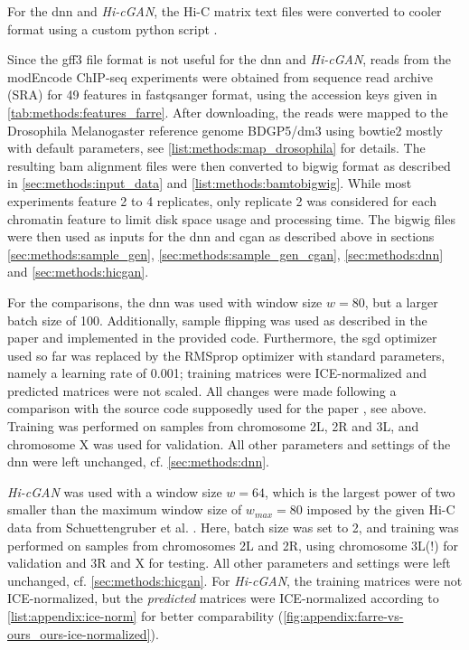 For the \acrshort{dnn} and \emph{Hi-cGAN}, the Hi-C matrix text files were converted to cooler format 
using a custom python script \cite[scripts/schuettengruberToCooler.py]{Krauth2021b}.

Since the gff3 file format is not useful for the \acrshort{dnn} and \emph{Hi-cGAN}, reads from the modEncode ChIP-seq experiments \cite{Roy2010} 
were obtained from sequence read archive (SRA) for 49 features in fastqsanger format, using the accession keys given in \cref{tab:methods:features_farre}.
After downloading, the reads were mapped to the Drosophila Melanogaster reference genome BDGP5/dm3 using bowtie2 \cite{Langmead2012} 
mostly with default parameters, see \cref{list:methods:map_drosophila} for details.
The resulting bam alignment files were then converted to bigwig format as described in \cref{sec:methods:input_data} and \cref{list:methods:bamtobigwig}.
While most experiments feature 2 to 4 replicates, only replicate 2 was considered for each chromatin feature to limit disk space usage and processing time.
The bigwig files were then used as inputs for the \acrshort{dnn} and \acrshort{cgan} as described above in sections \ref{sec:methods:sample_gen}, \ref{sec:methods:sample_gen_cgan}, \ref{sec:methods:dnn}
and \ref{sec:methods:hicgan}. 

For the comparisons, the \acrshort{dnn} was used with window size $w=80$,
but a larger batch size of 100.
Additionally, sample flipping was used as described in the paper \cite{Farre2018a} and implemented in the provided code.
Furthermore, the \acrshort{sgd} optimizer used so far was replaced by the RMS\-prop optimizer with standard parameters, namely a learning rate of 0.001;
training matrices were ICE-normalized and predicted matrices were not scaled.
All changes were made following a comparison with the source code supposedly used for the paper \cite{Farre2018a}, see above.
Training was performed on samples from chromosome 2L, 2R and 3L, and chromosome X was used for validation.
All other parameters and settings of the \acrshort{dnn} were left unchanged, cf. \cref{sec:methods:dnn}.

\emph{Hi-cGAN} was used with a window size $w=64$, which is the largest power of two 
smaller than the maximum window size of $w_\mathit{max}=80$ imposed by the given Hi-C data from Schuettengruber et al. \cite{Schuettengruber2014}.
Here, batch size was set to 2, and training was performed on samples from chromosomes 2L and 2R, 
using chromosome 3L(!) for validation and 3R and X for testing. 
All other parameters and settings were left unchanged, cf. \cref{sec:methods:hicgan}.
For \emph{Hi-cGAN}, the training matrices were not ICE-normalized, 
but the \emph{predicted} matrices were ICE-normalized according to \cref{list:appendix:ice-norm} for better comparability (\cref{fig:appendix:farre-vs-ours_ours-ice-normalized}).

